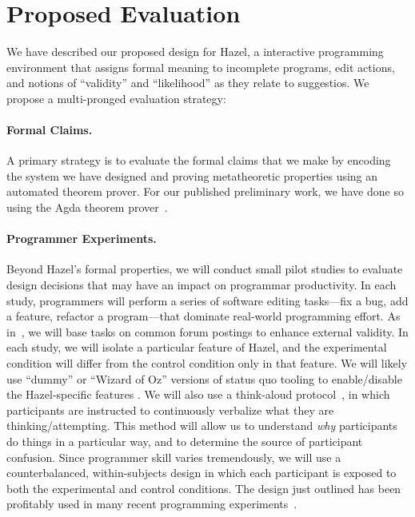 \documentclass[letterpaper,USenglish]{lipics-v2016}
\newcommand{\Hazel}[0]{\textsf{Hazel}}
\newcommand{\HazelEnv}[0]{\Hazel}
\begin{document}










\section{Proposed Evaluation}
\label{sec:eval}

We have described our proposed design for \HazelEnv, a interactive programming environment that assigns formal meaning  
to incomplete programs, edit actions, and notions of ``validity'' and
``likelihood'' as they relate to suggestios. We propose a multi-pronged evaluation
strategy: 

\paragraph{Formal Claims.} 
A primary strategy is to evaluate the formal claims that we make by encoding
the system we have designed and proving metatheoretic properties using an
automated theorem prover. For our published preliminary work, we have done so
using the Agda theorem prover~\cite{norell2009dependently}.

\paragraph{Programmer Experiments.} 
%
Beyond \Hazel's formal properties, we will conduct small pilot studies to
evaluate design decisions that may have an impact on programmar productivity. 
%
In each study, programmers will perform a series of software editing 
tasks---fix a bug, add a feature, refactor a program---that dominate 
real-world programming effort. As in~\cite{sunshine14plaiddoc}, 
we will base tasks on common forum postings to enhance external validity. In 
each study, we will isolate a particular feature of \Hazel, and the experimental 
condition will differ from the control condition only in that feature. We will 
likely use ``dummy'' or ``Wizard of Oz''  versions of status quo tooling to 
enable/disable the \HazelEnv-specific features \cite{wizard-of-oz}. We will also use 
a think-aloud protocol~\cite{think-aloud-protocol}, in which participants are 
instructed to continuously verbalize what they are thinking/attempting. This 
method will allow us to understand \textit{why} participants do things in a 
particular way, and to determine the source of participant confusion. Since 
programmer skill varies tremendously, we will use a counterbalanced, 
within-subjects design in which each participant is exposed to both the 
experimental and control conditions. 
The design just outlined has been profitably used in many recent programming 
experiments~\cite{stylos-constructor-params, static-typing-apidoc, benefits-generic-types}.
\end{document}
